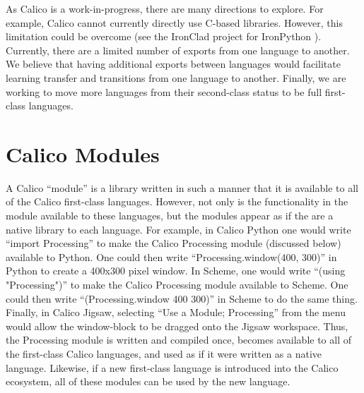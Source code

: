 \documentclass[preprint]{sigplanconf}
\begin{document}
As Calico is a work-in-progress, there are many directions to
explore. For example, Calico cannot currently directly use C-based
libraries.  However, this limitation could be overcome (see the
IronClad project for IronPython \cite{ironclad}). Currently, there are
a limited number of exports from one language to another. We believe
that having additional exports between languages would facilitate
learning transfer and transitions from one language to another.
Finally, we are working to move more languages from their second-class
status to be full first-class languages.


\section{Calico Modules}

A Calico ``module'' is a library written in such a manner that it is
available to all of the Calico first-class languages. However, not
only is the functionality in the module available to these languages,
but the modules appear as if the are a native library to each
language. For example, in Calico Python one would write ``import
Processing'' to make the Calico Processing module (discussed below)
available to Python. One could then write ``Processing.window(400,
300)'' in Python to create a 400x300 pixel window. In Scheme, one
would write ``(using "Processing")'' to make the Calico Processing
module available to Scheme. One could then write ``(Processing.window
400 300)'' in Scheme to do the same thing. Finally, in Calico Jigsaw,
selecting ``Use a Module; Processing'' from the menu would allow the
window-block to be dragged onto the Jigsaw workspace. Thus, the
Processing module is written and compiled once, becomes available to
all of the first-class Calico languages, and used as if it were
written as a native language. Likewise, if a new first-class language
is introduced into the Calico ecosystem, all of these modules can be
used by the new language.
\end{document}
